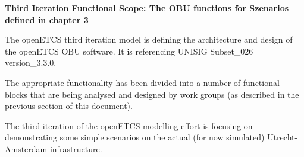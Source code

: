 \textbf{Third Iteration Functional Scope: The OBU functions for Szenarios defined in chapter 3}

The openETCS third iteration model is defining the architecture and design of the openETCS OBU software. 
It is referencing  \cite{subset-026} UNISIG Subset\_026 version\_3.3.0. 

The appropriate functionality has been divided into a number of functional blocks that are being analysed and designed by work groups (as described in the previous section of this document).

The third iteration of the openETCS modelling effort is focusing on demonstrating some simple scenarios on the actual (for now simulated) Utrecht- Amsterdam infrastructure.



